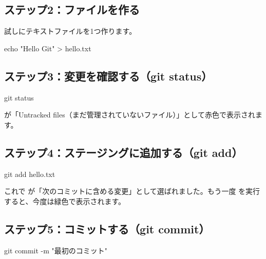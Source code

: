
\subsection{ステップ2：ファイルを作る}

試しにテキストファイルを1つ作ります。

\begin{codebox}[bash]
\begin{code}
echo "Hello Git" > hello.txt
\end{code}
\end{codebox}

\subsection{ステップ3：変更を確認する（git status）}

\begin{codebox}[bash]
\begin{code}
git status
\end{code}
\end{codebox}

 が「Untracked files（まだ管理されていないファイル）」として赤色で表示されます。

\subsection{ステップ4：ステージングに追加する（git add）}

\begin{codebox}[bash]
\begin{code}
git add hello.txt
\end{code}
\end{codebox}

これで  が「次のコミットに含める変更」として選ばれました。もう一度  を実行すると、今度は緑色で表示されます。

\subsection{ステップ5：コミットする（git commit）}

\begin{codebox}[bash]
\begin{code}
git commit -m "最初のコミット"
\end{code}
\end{codebox}


